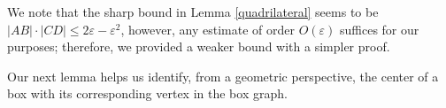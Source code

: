 \documentclass[12pt]{article}
\newcommand{\eps}{\varepsilon}
\begin{document}
We note that the sharp bound in Lemma \ref{quadrilateral} seems to be $|AB|\cdot|CD|\le 2\varepsilon-\eps^2$, however, any estimate of order $O(\eps)$ suffices for our purposes; therefore, we provided a weaker bound with a simpler proof. 







Our next lemma  helps us identify, from a geometric perspective, the center of a box with its corresponding vertex in the box graph.   
\end{document}
